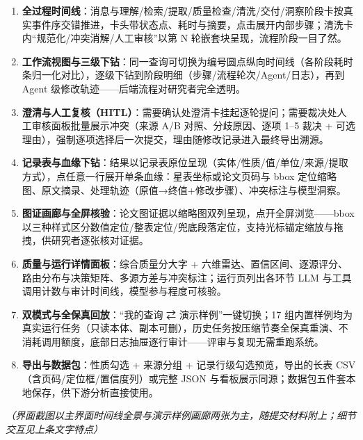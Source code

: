 \begin{enumerate}[leftmargin=1.6em,itemsep=2pt]
\item \textbf{全过程时间线}：消息与理解/检索/提取/质量检查/清洗/交付/洞察阶段卡按真实事件序交错推进，卡头带状态点、耗时与摘要，点击展开内部步骤；清洗卡内“规范化/冲突消解/人工审核”以第 N 轮嵌套块呈现，流程阶段一目了然。
\item \textbf{工作流视图与三级下钻}：同一查询可切换为编号圆点纵向时间线（各阶段耗时条归一化对比），逐级下钻到阶段明细（步骤/流程轮次/Agent/日志），再到 Agent 级修改轨迹——后端流程对研究者完全透明。
\item \textbf{澄清与人工复核（HITL）}：需要确认处澄清卡挂起逐轮提问；需要裁决处人工审核面板批量展示冲突（来源 A/B 对照、分歧原因、逐项 1--5 裁决 + 可选理由），强制逐项选择后一次提交，理由随修改记录进入最终导出溯源。
\item \textbf{记录表与血缘下钻}：结果以记录表原位呈现（实体/性质/值/单位/来源/提取方式），点任意一行展开单条血缘：星表坐标或论文页码与 bbox 定位缩略图、原文摘录、处理轨迹（原值→终值+修改步骤）、冲突标注与模型洞察。
\item \textbf{图证画廊与全屏核验}：论文图证据以缩略图双列呈现，点开全屏浏览——bbox 以三种样式区分数值定位/整表定位/兜底段落定位，支持光标锚定缩放与拖拽，供研究者逐张核对证据。
\item \textbf{质量与运行详情面板}：综合质量分大字 + 六维雷达、置信区间、逐源评分、路由分布与决策矩阵、多源方差与冲突标注；运行页列出各环节 LLM 与工具调用计数与审计时间线，模型参与程度可核验。
\item \textbf{双模式与全保真回放}：“我的查询 ⇄ 演示样例”一键切换；17 组内置样例均为真实运行任务（只读本体、副本可删），历史任务按压缩节奏全保真重演、不消耗调用额度，底部日志抽屉逐行审计——评审与复现无需重跑系统。
\item \textbf{导出与数据包}：性质勾选 + 来源分组 + 记录行级勾选预览，导出的长表 CSV（含页码/定位框/置信度列）或完整 JSON 与看板展示同源；数据包五件套本地保存，供下游分析直接使用。
\end{enumerate}

\noindent\emph{（界面截图以主界面时间线全景与演示样例画廊两张为主，随提交材料附上；细节交互见上条文字特点）}
